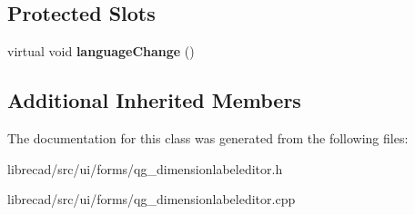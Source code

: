 \subsection*{Protected Slots}
\begin{DoxyCompactItemize}
\item 
\hypertarget{classQG__DimensionLabelEditor_a88c9ed16bcbab2c39d4f59e0f165593d}{virtual void {\bfseries language\-Change} ()}\label{classQG__DimensionLabelEditor_a88c9ed16bcbab2c39d4f59e0f165593d}

\end{DoxyCompactItemize}
\subsection*{Additional Inherited Members}


The documentation for this class was generated from the following files\-:\begin{DoxyCompactItemize}
\item 
librecad/src/ui/forms/qg\-\_\-dimensionlabeleditor.\-h\item 
librecad/src/ui/forms/qg\-\_\-dimensionlabeleditor.\-cpp\end{DoxyCompactItemize}
